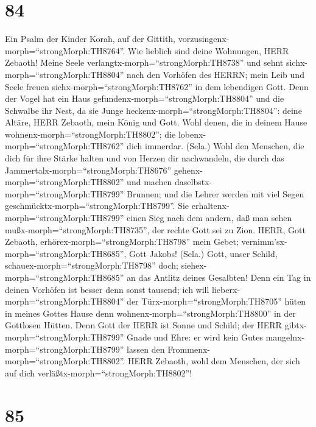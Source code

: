 \hypertarget{section-83}{%
\section{84}\label{section-83}}

 Ein Psalm der Kinder Korah, auf der Gittith,
vorzusingenx-morph=``strongMorph:TH8764''. Wie lieblich sind deine
Wohnungen, HERR Zebaoth!  Meine Seele
verlangtx-morph=``strongMorph:TH8738'' und sehnt
sichx-morph=``strongMorph:TH8804'' nach den Vorhöfen des HERRN; mein
Leib und Seele freuen sichx-morph=``strongMorph:TH8762'' in dem
lebendigen Gott.  Denn der Vogel hat ein Haus
gefundenx-morph=``strongMorph:TH8804'' und die Schwalbe ihr Nest, da sie
Junge heckenx-morph=``strongMorph:TH8804'': deine Altäre, HERR Zebaoth,
mein König und Gott.  Wohl denen, die in deinem Hause
wohnenx-morph=``strongMorph:TH8802''; die
lobenx-morph=``strongMorph:TH8762'' dich immerdar. (Sela.) 
Wohl den Menschen, die dich für ihre Stärke halten und von Herzen dir
nachwandeln,  die durch das
Jammertalx-morph=``strongMorph:TH8676''
gehenx-morph=``strongMorph:TH8802'' und machen
daselbstx-morph=``strongMorph:TH8799'' Brunnen; und die Lehrer werden
mit viel Segen geschmücktx-morph=``strongMorph:TH8799''. 
Sie erhaltenx-morph=``strongMorph:TH8799'' einen Sieg nach dem andern,
daß man sehen mußx-morph=``strongMorph:TH8735'', der rechte Gott sei zu
Zion.  HERR, Gott Zebaoth,
erhörex-morph=``strongMorph:TH8798'' mein Gebet;
vernimm'sx-morph=``strongMorph:TH8685'', Gott Jakobs! (Sela.)
 Gott, unser Schild, schauex-morph=``strongMorph:TH8798''
doch; siehex-morph=``strongMorph:TH8685'' an das Antlitz deines
Gesalbten!  Denn ein Tag in deinen Vorhöfen ist besser denn
sonst tausend; ich will lieberx-morph=``strongMorph:TH8804'' der
Türx-morph=``strongMorph:TH8705'' hüten in meines Gottes Hause denn
wohnenx-morph=``strongMorph:TH8800'' in der Gottlosen Hütten.
 Denn Gott der HERR ist Sonne und Schild; der HERR
gibtx-morph=``strongMorph:TH8799'' Gnade und Ehre: er wird kein Gutes
mangelnx-morph=``strongMorph:TH8799'' lassen den
Frommenx-morph=``strongMorph:TH8802''.  HERR Zebaoth, wohl
dem Menschen, der sich auf dich verläßtx-morph=``strongMorph:TH8802''!

\hypertarget{section-84}{%
\section{85}\label{section-84}}


